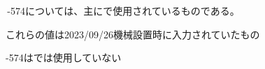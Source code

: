 \clearpage
\,-\ttNum574については、主に\BundledNCPrg{}で使用されているものである。
\begin{marker}
これらの値は2023/09/26機械設置時に入力されていたもの
\end{marker}
\begin{marker}
-\ttNum574は\CreatedNCPrg では使用していない
\end{marker}

